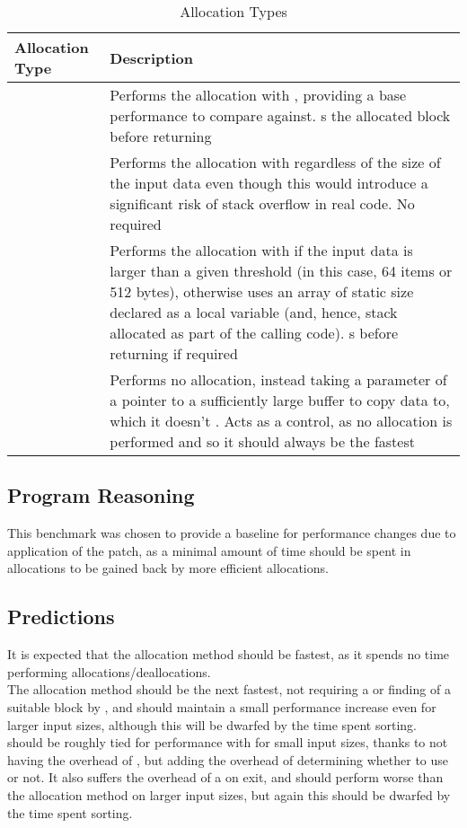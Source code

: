 \begin{table}
	\centering
	\begin{tabularx}{\linewidth}{>{\hsize=0.6\hsize}X >{\hsize=1.4\hsize}X}
		\toprule
		\textbf{Allocation Type} & \textbf{Description} \\
		\midrule
		\functionname{malloc} & Performs the allocation with \malloc{}, providing a base performance to compare against. \free{}s the allocated block before returning \\
		\functionname{stack} & Performs the allocation with \functionname{alloca} regardless of the size of the input data even though this would introduce a significant risk of stack overflow in real code. No \free{} required \\
		\functionname{dynamic} & Performs the allocation with \malloc{} if the input data is larger than a given threshold (in this case, 64 items or 512 bytes), otherwise uses an array of static size declared as a local variable (and, hence, stack allocated as part of the calling code). \free{}s before returning if required \\
		\functionname{external} & Performs no allocation, instead taking a parameter of a pointer to a sufficiently large buffer to copy data to, which it doesn't \free{}. Acts as a control, as no allocation is performed and so it should always be the fastest \\
		\bottomrule
	\end{tabularx}
	\caption{Allocation Types}\label{alloctype}
\end{table}

\subsection{Program Reasoning}

This benchmark was chosen to provide a baseline for performance changes due to application of the patch, as a minimal amount of time should be spent in allocations to be gained back by more efficient allocations.

\subsection{Predictions}

It is expected that the  allocation method should be fastest, as it spends no time performing allocations/deallocations. \\
The  allocation method should be the next fastest, not requiring a \free{} or finding of a suitable block by \malloc{}, and should maintain a small performance increase even for larger input sizes, although this will be dwarfed by the time spent sorting. \\
 should be roughly tied for performance with  for small input sizes, thanks to not having the overhead of , but adding the overhead of determining whether to use \malloc{} or not. It also suffers the overhead of a \free{} on exit, and should perform worse than the  allocation method on larger input sizes, but again this should be dwarfed by the time spent sorting.

